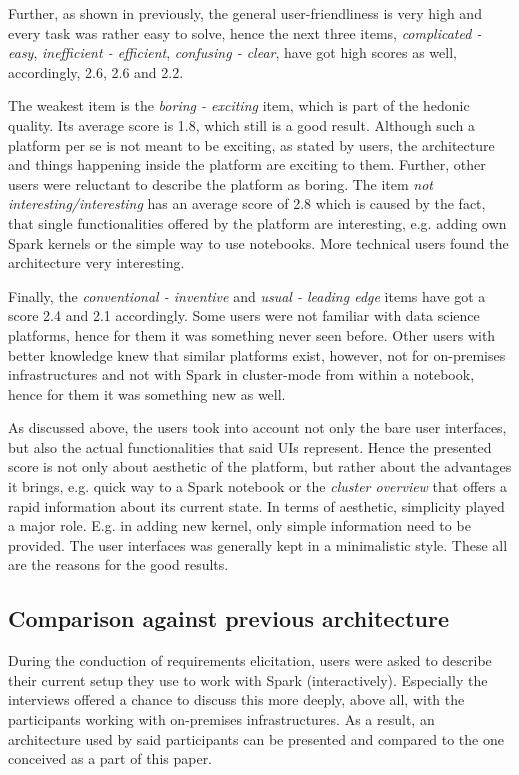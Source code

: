 \documentclass[a4paper,twoside]{article}
\begin{document}
Further, as shown in previously, the general user-friendliness is very high and every task was rather easy to solve, hence the next three items, \textit{complicated - easy},  \textit{inefficient - efficient}, \textit{confusing - clear}, have got high scores as well, accordingly, 2.6, 2.6 and 2.2. 

The weakest item is the \textit{boring - exciting} item, which is part of the hedonic quality. Its average score is 1.8, which still is a good result. Although such a platform per se is not meant to be exciting, as stated by users, the architecture and things happening inside the platform are exciting to them. Further, other users were reluctant to describe the platform as boring. The item \textit{not interesting/interesting} has an average score of 2.8 which is caused by the fact, that single functionalities offered by the platform are interesting, e.g. adding own Spark kernels or the simple way to use notebooks. More technical users found the architecture very interesting.

Finally, the \textit{conventional - inventive} and \textit{usual - leading edge} items have got a score 2.4 and 2.1 accordingly. Some users were not familiar with data science platforms, hence for them it was something never seen before. Other users with better knowledge knew that similar platforms exist, however, not for on-premises infrastructures and not with Spark in cluster-mode from within a notebook, hence for them it was something new as well.

As discussed above, the users took into account not only the bare user interfaces, but also the actual functionalities that said UIs represent. Hence the presented score is not only about aesthetic of the platform, but rather about the advantages it brings, e.g. quick way to a Spark notebook or the \textit{cluster overview} that offers a rapid information about its current state. In terms of aesthetic, simplicity played a major role. E.g. in adding new kernel, only simple information need to be provided. The user interfaces was generally kept in a minimalistic style. These all are the reasons for the good results.

\subsection{Comparison against previous architecture}

During the conduction of requirements elicitation, users were asked to describe their current setup they use to work with Spark (interactively). Especially the interviews offered a chance to discuss this more deeply, above all, with the participants working with on-premises infrastructures. As a result, an architecture used by said participants can be presented and compared to the one conceived as a part of this paper.
\end{document}
